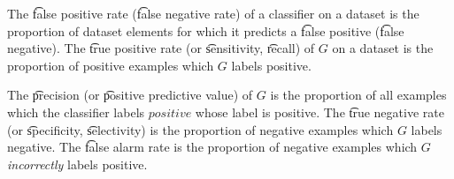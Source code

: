 The \t{false positive rate} (\t{false negative rate}) of a classifier on a dataset is the proportion of dataset elements for which it predicts a \t{false positive} (\t{false negative}).
The \t{true positive rate} (or \t{sensitivity}, \t{recall}) of $G$ on a dataset is the proportion of positive examples which $G$ labels positive.

The \t{precision} (or \t{positive predictive value}) of $G$ is the proportion of all examples which the classifier labels $positive$ whose label is positive.
The \t{true negative rate} (or \t{specificity}, \t{selectivity}) is the proportion of negative examples which $G$ labels negative.
The \t{false alarm rate} is the proportion of negative examples which $G$ \textit{incorrectly} labels positive.

\blankpage